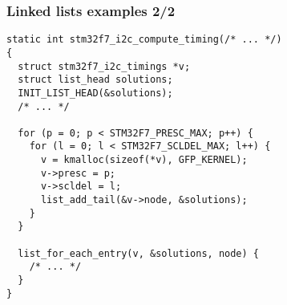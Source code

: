 \begin{frame}[fragile]
  \frametitle{Linked lists examples 2/2}

\begin{block}{}
\begin{verbatim}
static int stm32f7_i2c_compute_timing(/* ... */)
{
  struct stm32f7_i2c_timings *v;
  struct list_head solutions;
  INIT_LIST_HEAD(&solutions);
  /* ... */

  for (p = 0; p < STM32F7_PRESC_MAX; p++) {
    for (l = 0; l < STM32F7_SCLDEL_MAX; l++) {
      v = kmalloc(sizeof(*v), GFP_KERNEL);
      v->presc = p;
      v->scldel = l;
      list_add_tail(&v->node, &solutions);
    }
  }

  list_for_each_entry(v, &solutions, node) {
    /* ... */
  }
}
\end{verbatim}
\end{block}
\end{frame}
